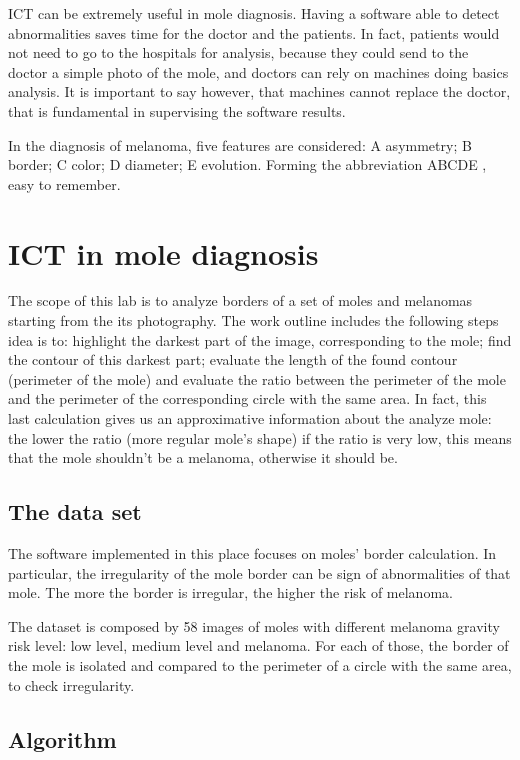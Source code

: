 \documentclass[a4paper,12pt,oneside,titlepage]{article}
\begin{document}
	ICT can be extremely useful in mole diagnosis. Having a software able to detect abnormalities saves time for the doctor and the patients. In fact, patients would not need to go to the hospitals for analysis, because they could send to the doctor a simple photo of the mole, and doctors can rely on machines doing basics analysis. It is important to say however, that machines cannot replace the doctor, that is fundamental in supervising the software results. 
	
	In the diagnosis of melanoma, five features are considered: A asymmetry; B border; C color; D diameter; E evolution. Forming the abbreviation ABCDE , easy to remember.
	
	
	\section{ICT in mole diagnosis}
	The scope of this lab is to analyze borders of a set of moles and melanomas starting from the its photography. The work outline includes the following steps idea is to: highlight the darkest part of the image, corresponding to the mole; find the contour of this darkest part; evaluate the length of the found contour (perimeter of the mole) and evaluate the ratio between the perimeter of the mole and the perimeter of the corresponding circle with the same area. In fact, this last calculation gives us an approximative information about the analyze mole: the lower the ratio (more regular mole's shape) if the ratio is very low, this means that the mole shouldn’t be a melanoma, otherwise it should be.
	
	
	\subsection{The data set}
	The software implemented in this place focuses on moles' border calculation. In particular, the irregularity of the mole border can be sign of abnormalities of that mole. The more the border is irregular, the higher the risk of melanoma. 
	
	The dataset is composed by 58 images of moles with different melanoma gravity risk level: low level, medium level and melanoma. For each of those, the border of the mole is isolated and compared to the perimeter of a circle with the same area, to check irregularity. 
	\subsection{Algorithm}
\end{document}

